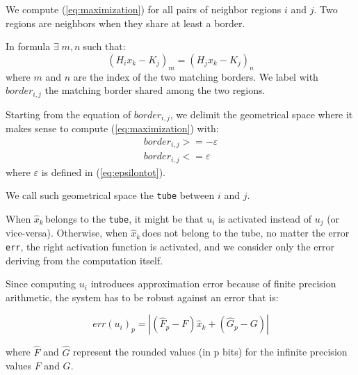 \documentclass[sigconf]{acmart}
\newcommand{\statevar}{x_{k}}
\newcommand{\qstatevar}{\hat{x}_{k}}
\newcommand{\qstatevarmath}{$\hat{x}_{k}\,$}
\begin{document}

We compute (\ref{eq:maximization}) for all pairs of neighbor regions $i$ and $j$. Two regions are neighbors when they share at least a border.

In formula $\exists\; m,n \;$such that:
\begin{equation}
(H_{i}\statevar-K_{j})_{m} = (H_{j}\statevar-K_{j})_{n}
\end{equation}
where $m$ and $n$ are the index of the two matching borders. We label with $border_{i,j}$ the matching border shared among the two regions.

Starting from the equation of $border_{i,j}$, we delimit the geometrical space where it makes sense to compute (\ref{eq:maximization}) with: 
\begin{equation}
\begin{aligned}
border_{i,j} >= -\varepsilon\\
border_{i,j} <= \varepsilon
\end{aligned} 
\end{equation}
where $\varepsilon$ is defined in (\ref{eq:epsilontot}).

We call such geometrical space the \texttt{tube} between $i$ and $j$.

When \qstatevarmath belongs to the \texttt{tube}, it might be that $u_{i}$ is activated instead of $u_{j}$ (or vice-versa). Otherwise, when \qstatevarmath does not belong to the tube, no matter the error \texttt{err}, the right activation function is activated, and we consider only the error deriving from the computation itself.

Since computing $u_{i}$ introduces approximation error because of finite precision arithmetic, the system has to be robust against an error that is:

\begin{equation}\label{eq:fperror}
err(u_{i})_{p}=|(\hat{F}_{p}-F)\qstatevar+(\hat{G}_{p}-G)|
\end{equation}

where $\hat{F}$ and $\hat{G}$ represent the rounded values (in p bits) for the infinite precision values $F$ and $G$.
\end{document}
